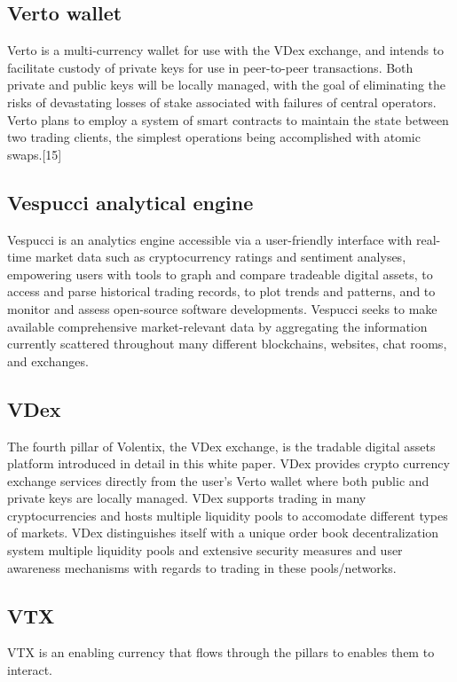 \documentclass[]{article}
\begin{document}
{\subsection {Verto wallet}

Verto is a multi-currency wallet for use with the VDex exchange, and intends to facilitate custody of private keys for use in peer-to-peer transactions. Both private and public keys will be locally managed, with the goal of eliminating the risks of devastating losses of stake associated with failures of central operators. 
Verto plans to employ a system of smart contracts to maintain the state between two trading clients, the simplest operations being accomplished with atomic swaps.[15]


\subsection {Vespucci analytical engine}

Vespucci is an analytics engine accessible via a user-friendly interface with real-time market data such as cryptocurrency ratings and sentiment analyses, empowering users with tools to graph and compare tradeable digital assets, to access and parse historical trading records, to plot trends and patterns, and to monitor and assess open-source software developments. Vespucci seeks to make available comprehensive market-relevant data by aggregating the information currently scattered throughout many different blockchains, websites, chat rooms, and exchanges. 


\subsection {VDex}

The fourth pillar of Volentix, the VDex exchange, is the tradable digital assets platform introduced in detail in this white paper.
VDex provides crypto currency exchange services directly from the user's Verto wallet where both public and private keys are locally managed.
VDex supports trading in many cryptocurrencies and hosts multiple liquidity pools to accomodate different types of markets.
VDex distinguishes itself with a unique order book decentralization system  multiple liquidity pools and extensive security measures and user awareness mechanisms with regards to trading in these pools/networks.


\subsection {VTX}
VTX is an enabling currency that flows through the pillars to enables them to interact.

}
\end{document}
